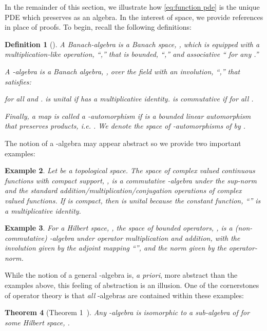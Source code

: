 \documentclass[final,leqno]{amsart}
\newtheorem{theorem}{Theorem}[section]
\newtheorem{definition}[theorem]{Definition}
\newtheorem{example}[theorem]{Example}
\begin{document}
In the remainder of this section, we illustrate how \eqref{eq:function pde} is the unique PDE which preserves  as an algebra.
In the interest of space, we provide references in place of proofs.
To begin, recall the following definitions:
\begin{definition}[\cite{Conway1990}] \label{def:algebra}
	A \emph{Banach-algebra} is a Banach space, , which is equipped with a multiplication-like operation, ``,''  that is bounded, ``,'' and associative `` for any .''
	
	A \emph{-algebra} is a Banach algebra, , over the field  with an involution, ``,'' that satisfies:
	
	for all  and .
	 is \emph{unital} if  has a multiplicative identity.
	 is \emph{commutative} if  for all .
	
	Finally, a map  is called a -automorphism if  is a bounded linear automorphism that preserves products, i.e. .
	We denote the space of -automorphisms of  by .
\end{definition}

The notion of a -algebra may appear abstract so we provide two important examples:
\begin{example} \label{ex:function algebra}
	Let  be a topological space.
	The space of complex valued continuous functions with compact support, , is a commutative -algebra under the sup-norm and the standard addition/multiplication/conjugation operations of complex valued functions.
	If  is compact, then  is unital because the constant function, ``'' is a multiplicative identity.
\end{example}

\begin{example} \label{ex:nc algebra} 
	For a Hilbert space, , the space of bounded operators, , is a (non-commutative) -algebra	under operator multiplication and addition, with the involution given by the adjoint mapping ``'', and the norm given by the operator-norm.
\end{example}

While the notion of a general -algebra is, \textit{a priori}, more abstract than the examples above, this feeling of abstraction is an illusion.
One of the cornerstones of operator theory is that \emph{all} -algebras are contained within these examples:

\begin{theorem}[Theorem 1~\cite{GelfandNaimark1943}] \label{thm:GN1}
	Any -algebra is isomorphic to a sub-algebra of  for some Hilbert space, .
\end{theorem}
\end{document}
